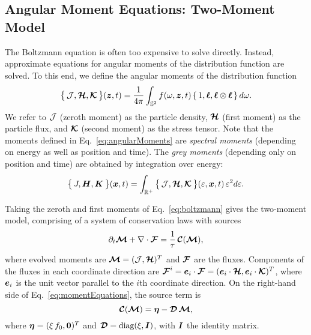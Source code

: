 \subsection{Angular Moment Equations: Two-Moment Model}

The Boltzmann equation is often too expensive to solve directly.  
Instead, approximate equations for angular moments of the distribution function are solved.  
To this end, we define the angular moments of the distribution function
\begin{equation}
  \big\{\,\mathcal{J},\boldsymbol{\mathcal{H}},\boldsymbol{\mathcal{K}}\,\big\}(\boldsymbol{z},t)
  =\frac{1}{4\pi}\int_{\mathbb{S}^{2}}f(\omega,\boldsymbol{z},t)\,\{\,1,\boldsymbol{\ell},\boldsymbol{\ell}\otimes\boldsymbol{\ell}\,\}\,d\omega.  
  \label{eq:angularMoments}
\end{equation}
We refer to $\mathcal{J}$ (zeroth moment) as the particle density, $\boldsymbol{\mathcal{H}}$ (first moment) as the particle flux, and $\boldsymbol{\mathcal{K}}$ (second moment) as the stress tensor.  
Note that the moments defined in Eq.~\eqref{eq:angularMoments} are \emph{spectral moments} (depending on energy as well as position and time).  
The \emph{grey moments} (depending only on position and time) are obtained by integration over energy:
\begin{equation}
  \big\{\,J,\boldsymbol{H},\boldsymbol{K}\,\big\}(\boldsymbol{x},t)
  =\int_{\mathbb{R}^{+}}\big\{\,\mathcal{J},\boldsymbol{\mathcal{H}},\boldsymbol{\mathcal{K}}\,\big\}(\varepsilon,\boldsymbol{x},t)\,\varepsilon^{2}d\varepsilon.  
\end{equation}

Taking the zeroth and first moments of Eq.~\eqref{eq:boltzmann} gives the two-moment model, comprising of a system of conservation laws with sources
\begin{equation}
  \partial_{t}{\boldsymbol{\mathcal{M}}}+\nabla\cdot\boldsymbol{\mathcal{F}}=\frac{1}{\tau}\,\boldsymbol{\mathcal{C}}(\boldsymbol{\mathcal{M}}),
  \label{eq:momentEquations}
\end{equation}
where evolved moments are $\boldsymbol{\mathcal{M}}=(\mathcal{J},\boldsymbol{\mathcal{H}})^{T}$ and $\boldsymbol{\mathcal{F}}$ are the fluxes.  
Components of the fluxes in each coordinate direction are $\boldsymbol{\mathcal{F}}^{i}=\boldsymbol{e}_{i}\cdot\boldsymbol{\mathcal{F}}=(\boldsymbol{e}_{i}\cdot\boldsymbol{\mathcal{H}},\boldsymbol{e}_{i}\cdot\boldsymbol{\mathcal{K}})^{T}$, where $\boldsymbol{e}_{i}$ is the unit vector parallel to the $i$th coordinate direction.  
On the right-hand side of Eq.~\eqref{eq:momentEquations}, the source term is
\begin{equation}
  \boldsymbol{\mathcal{C}}(\boldsymbol{\mathcal{M}})=\boldsymbol{\eta}-\boldsymbol{\mathcal{D}}\,\boldsymbol{\mathcal{M}}, 
  \label{eq:collisionTermMoments}
\end{equation}
where $\boldsymbol{\eta}=(\xi\,f_{0},\boldsymbol{0})^{T}$ and $\boldsymbol{\mathcal{D}}=\mbox{diag}(\xi,\boldsymbol{I})$, with $\boldsymbol{I}$ the identity matrix.  


